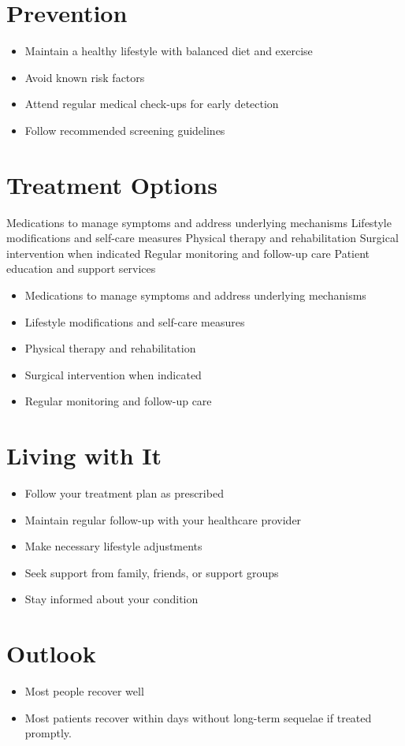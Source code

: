 \section{Prevention}
\begin{itemize}[noitemsep]
  \item Maintain a healthy lifestyle with balanced diet and exercise
  \item Avoid known risk factors
  \item Attend regular medical check-ups for early detection
  \item Follow recommended screening guidelines
\end{itemize}
\section{Treatment Options}
Medications to manage symptoms and address underlying mechanisms Lifestyle modifications and self-care measures Physical therapy and rehabilitation Surgical intervention when indicated Regular monitoring and follow-up care Patient education and support services

\begin{itemize}[noitemsep]
  \item Medications to manage symptoms and address underlying mechanisms
  \item Lifestyle modifications and self-care measures
  \item Physical therapy and rehabilitation
  \item Surgical intervention when indicated
  \item Regular monitoring and follow-up care
\end{itemize}
\section{Living with It}
\begin{itemize}[noitemsep]
  \item Follow your treatment plan as prescribed
  \item Maintain regular follow-up with your healthcare provider
  \item Make necessary lifestyle adjustments
  \item Seek support from family, friends, or support groups
  \item Stay informed about your condition
\end{itemize}
\section{Outlook}
\begin{itemize}[noitemsep]
  \item Most people recover well
  \item Most patients recover within days without long-term sequelae if treated promptly.
\end{itemize}
